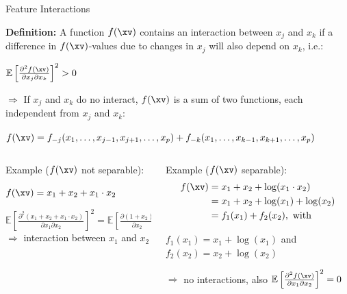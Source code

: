 \documentclass[11pt,compress,t,notes=noshow, aspectratio=169, xcolor=table]{beamer}
\begin{document}
\begin{frame}{Feature Interactions }

\textbf{Definition:} A function $f(\xv)$ contains an interaction between $x_j$ and $x_k$ if a difference in $f(\xv)$-values due to changes in $x_j$ will also depend on $x_k$, i.e.: %
\medskip
\centerline{$\mathbb{E} \left[ \frac{\partial^2 f(\xv)}{\partial x_j \partial x_k} \right]^2 > 0$}
\medskip
$\Rightarrow$ If $x_j$ and $x_k$ do no interact, $f(\xv)$ is a sum of two functions, each independent from $x_j$ and $x_k$:

\medskip

\centerline{$f(\xv) = f_{-j}(x_1, \ldots, x_{j-1}, x_{j+1}, \ldots, x_p) + f_{-k}(x_1, \ldots, x_{k-1}, x_{k+1}, \ldots, x_p)$}

\medskip\pause

\begin{columns}[T, totalwidth=\textwidth]
\begin{column}{0.5\textwidth}
Example ($f(\xv)$ not separable):
\medskip

\centerline{$f(\xv) = x_1 + x_2 + x_1 \cdot x_2$}
\medskip
$\mathbb{E} \left[ \tfrac{\partial^2 (x_1 + x_2 + x_1 \cdot x_2)}{\partial x_1 \partial x_2} \right]^2 = \mathbb{E} \left[ \tfrac{\partial (1 + x_2)}{\partial x_2} \right]^2 = 1 > 0$\\
\medskip
$\Rightarrow$ interaction between $x_1$ and $x_2$ 
\end{column}
\pause
\begin{column}{0.5\textwidth}
Example ($f(\xv)$ separable):
\setlength{\abovedisplayskip}{0pt}
\setlength{\belowdisplayskip}{0pt}
\setlength{\abovedisplayshortskip}{0pt}
\setlength{\belowdisplayshortskip}{0pt}
\medskip
\begin{align*}
	f(\xv) &= x_1 + x_2 + \log(x_1 \cdot x_2)\\
	       &= x_1 + x_2 + \log(x_1) + \log(x_2)\\
	       &= f_1(x_1) + f_2(x_2), \text{ with }
\end{align*}

\medskip

$f_1(x_1) = x_1 + \log(x_1)$ and $f_2(x_2) = x_2 + \log(x_2)$

\medskip

$\Rightarrow$ no interactions, also $\mathbb{E} \left[ \tfrac{\partial^2 f(\xv)}{\partial x_1 \partial x_2} \right]^2 = 0$
\end{column} 
\end{columns}

\end{frame}
\end{document}
